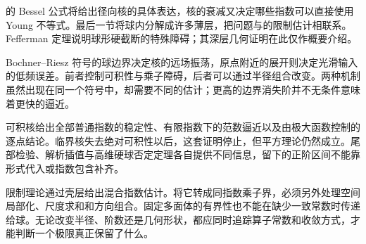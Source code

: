 \ProseParagraphBreak

的 Bessel 公式将给出径向核的具体表达，核的衰减又决定哪些指数可以直接使用 Young 不等式。最后一节将球内分解成许多薄层，把问题与的限制估计相联系。Fefferman 定理说明球形硬截断的特殊障碍；其深层几何证明在此仅作概要介绍。






\begin{chaptersummary}
Bochner--Riesz 符号的球边界决定核的远场振荡，原点附近的展开则决定光滑输入的低频误差。前者控制可积性与乘子障碍，后者可以通过半径组合改变。两种机制虽然出现在同一个符号中，却需要不同的估计；更高的边界消失阶并不无条件意味着更快的逼近。

\ProseParagraphBreak

可积核给出全部普通指数的稳定性、有限指数下的范数逼近以及由极大函数控制的逐点结论。临界核失去绝对可积性以后，这套证明停止，但平方理论仍然成立。尾部检验、解析插值与高维硬球否定定理各自提供不同信息，留下的正阶区间不能靠形式代入或指数包含补齐。

\ProseParagraphBreak

限制理论通过壳层给出混合指数估计。将它转成同指数乘子界，必须另外处理空间局部化、尺度求和和方向组合。固定多面体的有界性也不能在缺少一致常数时传递给球。无论改变半径、阶数还是几何形状，都应同时追踪算子常数和收敛方式，才能判断一个极限真正保留了什么。
\end{chaptersummary}

\BookExercises

